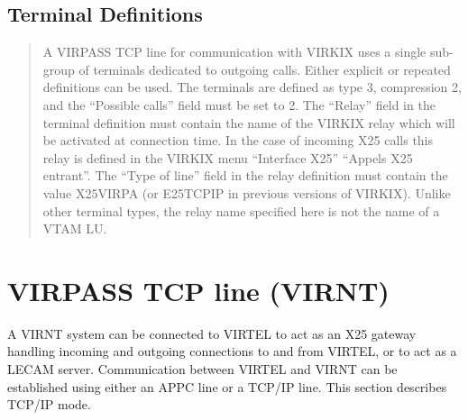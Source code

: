 \documentclass[letterpaper,10pt,english]{sphinxmanual}
\begin{document}
\subsection{Terminal Definitions}
\label{\detokenize{connectivity_guide:index-44}}\label{\detokenize{connectivity_guide:id17}}\begin{quote}

A VIRPASS TCP line for communication with VIRKIX uses a single sub-group of terminals dedicated to outgoing calls. Either explicit or repeated definitions can be used. The terminals are defined as type 3, compression 2, and the “Possible calls” field must be set to 2. The “Relay” field in the terminal definition must contain the name of the VIRKIX relay which will be activated at connection time. In the case of incoming X25 calls this relay is defined in the VIRKIX menu “Interface X25” \textendash{} “Appels X25 entrant”. The “Type of
line” field in the relay definition must contain the value X25VIRPA (or E25TCPIP in previous versions of VIRKIX). Unlike other terminal types, the relay name specified here is not the name of a VTAM LU.
\end{quote}


\newpage


\section{VIRPASS TCP line (VIRNT)}
\label{\detokenize{connectivity_guide:index-45}}\label{\detokenize{connectivity_guide:virpass-tcp-line-virnt}}
A VIRNT system can be connected to VIRTEL to act as an X25 gateway handling incoming and outgoing connections to and from VIRTEL, or to act as a LECAM server. Communication between VIRTEL and VIRNT can be established using either an APPC line or a TCP/IP line. This section describes TCP/IP mode.


\end{document}
